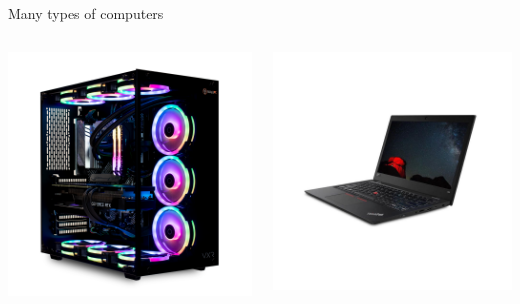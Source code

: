\begin{frame}{Many types of computers \insertcontinuationtext}
  \begin{columns}
    \begin{column}{.5\textwidth}
  \includegraphics[width=\textwidth]{images/desktop.png}
    \end{column}
    \begin{column}{.5\textwidth}
  \includegraphics[width=\textwidth]{images/laptop.jpg}
    \end{column}
  \end{columns}
\end{frame}

